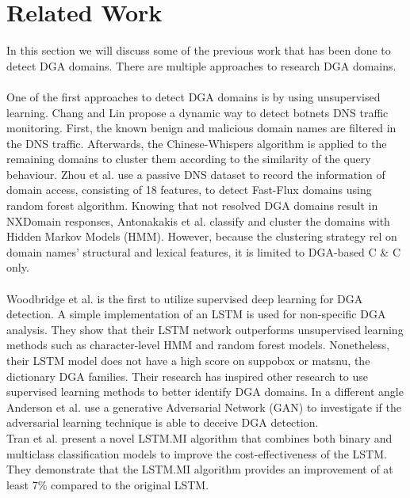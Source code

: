 \chapter{Related Work}\label{relatedwork}
In this section we will discuss some of the previous work that has been done to detect DGA domains. There are multiple approaches to research DGA domains.\\\\
One of the first approaches to detect DGA domains is by using unsupervised learning. Chang and Lin \cite{Chang_Lin} propose a dynamic way to detect botnets DNS traffic monitoring. First, the known benign and malicious domain names are filtered in the DNS traffic.  Afterwards, the Chinese-Whispers algorithm is applied to the remaining domains to cluster them according to the similarity of the query behaviour. 
Zhou et al. \cite{Zhou2013DGABasedBD} use a passive DNS dataset to record the information of domain access, consisting of 18 features, to detect Fast-Flux domains using random forest algorithm. 
Knowing that not resolved DGA domains result in NXDomain responses, Antonakakis et al. \cite{Antonakakis} classify and cluster the domains with Hidden Markov Models (HMM). However, because the clustering strategy rel on domain names' structural and lexical features, it is limited to DGA-based C \& C only.\\\\ 
Woodbridge et al. \cite{Woodbridge} is the first to utilize supervised deep learning for DGA detection. A simple implementation of an LSTM is used for non-specific DGA analysis. They show that their LSTM network outperforms unsupervised learning methods such as character-level HMM and random forest models. Nonetheless, their LSTM model does not have a high score on suppobox or matsnu, the dictionary DGA families. Their research has inspired other research to use supervised learning methods to better identify DGA domains. 
In a different angle Anderson et al. \cite{Anderson} use a generative Adversarial Network (GAN) to investigate if the adversarial learning technique is able to deceive DGA detection.
\pagebreak
\\Tran et al. \cite{TRAN20182401} present a novel LSTM.MI algorithm that combines both binary and multiclass classification models to improve the cost-effectiveness of the LSTM. They demonstrate that the LSTM.MI algorithm provides an improvement of at least 7\% compared to the original LSTM.
